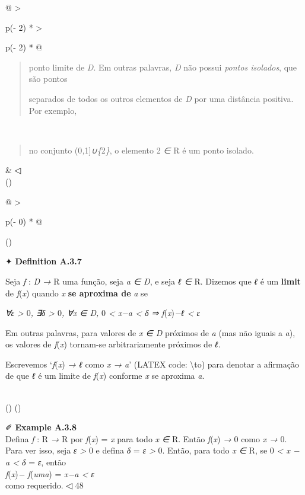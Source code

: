 \documentclass[
]{article}
\begin{document}
\begin{longtable}[]{@{}
  >{\raggedright\arraybackslash}p{(\columnwidth - 2\tabcolsep) * }
  >{\raggedright\arraybackslash}p{(\columnwidth - 2\tabcolsep) * }@{}}
{\begin{minipage}[t]{\linewidth}
\begin{quote}
ponto limite de \emph{D}. Em outras palavras, \emph{D} não possui
\emph{pontos isolados}, que são pontos

separados de todos os outros elementos de \emph{D} por uma distância
positiva. Por exemplo,
\end{quote}
\end{minipage}} \\
\begin{minipage}[t]{\linewidth}\raggedright
\begin{quote}
no conjunto (0\emph{,}1{]}\emph{∪\{}2\emph{\}}, o elemento 2 \emph{∈} R
é um ponto isolado.
\end{quote}
\end{minipage} & ◁ \\
\bottomrule()
\end{longtable}

\begin{longtable}[]{@{}
  >{\raggedright\arraybackslash}p{(\columnwidth - 0\tabcolsep) * }@{}}
\toprule()
\begin{minipage}[b]{\linewidth}\raggedright
✦ \textbf{Definition A.3.7}

Seja \emph{f} : \emph{D →} R uma função, seja \emph{a ∈ D}, e seja
\emph{ℓ ∈} R. Dizemos que \emph{ℓ} é um \textbf{limit} de
\emph{f}(\emph{x}) quando \emph{x} \textbf{se aproxima de} \emph{a} se

\emph{∀ε \textgreater{}} 0\emph{, ∃δ \textgreater{}} 0\emph{, ∀x ∈ D,} 0
\emph{\textless{} \textbar x−a\textbar{} \textless{} δ ⇒ \textbar{}
f}(\emph{x})\emph{−ℓ\textbar{} \textless{} ε}

Em outras palavras, para valores de \emph{x ∈ D} próximos de \emph{a}
(mas não iguais a \emph{a}), os valores de \emph{f}(\emph{x}) tornam-se
arbitrariamente próximos de \emph{ℓ}.

Escrevemos `\emph{f}(\emph{x}) \emph{→ ℓ} como \emph{x → a}' (LATEX
code: \textbackslash to) para denotar a afirmação de que \emph{ℓ} é um
limite de \emph{f}(\emph{x}) conforme \emph{x} se aproxima \emph{a}.
\end{minipage} \\
\midrule()
\endhead
\bottomrule()
\end{longtable}

✐ \textbf{Example A.3.8}\\
Defina \emph{f} : R \emph{→} R por \emph{f}(\emph{x}) = \emph{x} para
todo \emph{x ∈} R. Então \emph{f}(\emph{x}) \emph{→} 0 como \emph{x →}
0. Para ver isso, seja \emph{ε \textgreater{}} 0 e defina \emph{δ} =
\emph{ε \textgreater{}} 0. Então, para todo \emph{x ∈} R, se 0
\emph{\textless{} \textbar x − a\textbar{} \textless{} δ} = \emph{ε},
então\\
\emph{\textbar f}(\emph{x})\emph{− f}(\emph{uma})\emph{\textbar{}} =
\emph{\textbar x−a\textbar{} \textless{} ε}\\
como requerido. ◁ 48
\end{document}
